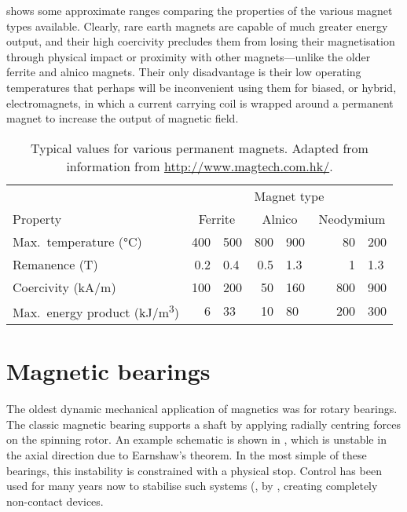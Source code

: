  shows some approximate ranges comparing the
properties of the various magnet types available. Clearly, rare earth
magnets are capable of much greater energy output, and their high
coercivity precludes them from losing their magnetisation through
physical impact or proximity with other magnets---unlike the older
ferrite and alnico magnets. Their only disadvantage is their low
operating temperatures that perhaps will be inconvenient using them
for biased, or hybrid, electromagnets, in which a current carrying
coil is wrapped around a permanent magnet to increase the output of
magnetic field.

\begin{table}
  \centering
  \begin{tabular}{@{} l r@{\,--\,}l r@{\,--\,}l r@{\,--\,}l @{}}
    \toprule
    & \multicolumn{6}{c}{Magnet type}\\
    \cmidrule{2-6}
    Property            & \multicolumn{2}{c}{Ferrite}   
                        & \multicolumn{2}{c}{Alnico}   
                        & \multicolumn{2}{c}{Neodymium}  \\
    \midrule
    Max.\ temperature (°C)    & \num{400} & \num{500} & \num{800} & \num{900} &    \num{ 80} & \num{200}  \\
    Remanence (T)             & \num{0.2} & \num{0.4} & \num{0.5} & \num{1.3} &    \num{  1} & \num{1.3}  \\
    Coercivity (\si{kA/m})    & \num{100} & \num{200} & \num{50 } & \num{160} & ~~~\num{800} & \num{900}  \\
    Max.\ energy product 
               (\si{kJ/m^3})  & \num{6}   & \num{33}  & \num{10}  & \num{80}  &    \num{200} & \num{300}  \\
    \bottomrule
  \end{tabular}
  \caption[Typical values for various permanent magnets.]
  {Typical values for various permanent magnets. 
   Adapted from information from \url{http://www.magtech.com.hk/}.}
\end{table}


\section{Magnetic bearings}

The oldest dynamic mechanical application of magnetics was for rotary
bearings.  The classic magnetic bearing supports a shaft by applying
radially centring forces on the spinning rotor. An example schematic
is shown in , which is unstable in the axial
direction due to Earnshaw's theorem. In the most simple of these
bearings, this instability is constrained with a physical stop.
Control has been used for many years now to stabilise such systems
(\eg, by \textcite{shimizu1968}, creating completely non-contact devices.

